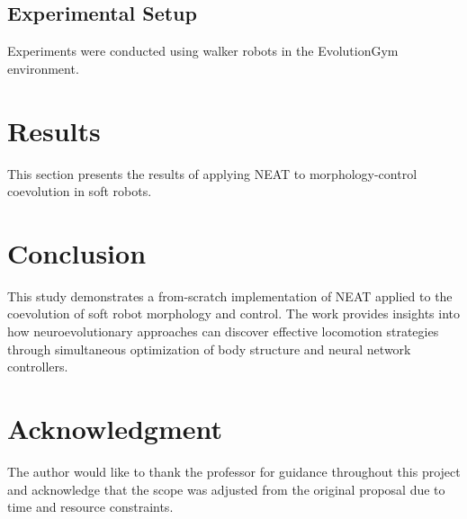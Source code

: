 \documentclass[conference]{IEEEtran}
\begin{document}
\subsection{Experimental Setup}
Experiments were conducted using walker robots in the EvolutionGym environment.

\section{Results}
This section presents the results of applying NEAT to morphology-control coevolution in soft robots.

\section{Conclusion}
This study demonstrates a from-scratch implementation of NEAT applied to the coevolution of soft robot morphology and control. The work provides insights into how neuroevolutionary approaches can discover effective locomotion strategies through simultaneous optimization of body structure and neural network controllers.

\section*{Acknowledgment}

The author would like to thank the professor for guidance throughout this project and acknowledge that the scope was adjusted from the original proposal due to time and resource constraints.



\end{document}

